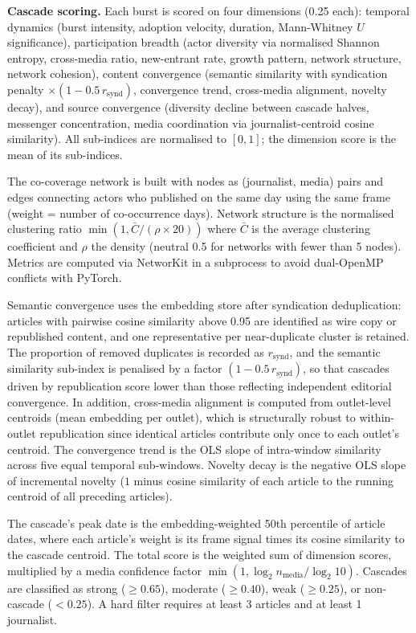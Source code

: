 \textbf{Cascade scoring.} Each burst is scored on four dimensions (0.25 each): temporal dynamics (burst intensity, adoption velocity, duration, Mann-Whitney $U$ significance), participation breadth (actor diversity via normalised Shannon entropy, cross-media ratio, new-entrant rate, growth pattern, network structure, network cohesion), content convergence (semantic similarity with syndication penalty $\times (1 - 0.5\, r_{\text{synd}})$, convergence trend, cross-media alignment, novelty decay), and source convergence (diversity decline between cascade halves, messenger concentration, media coordination via journalist-centroid cosine similarity). All sub-indices are normalised to $[0,1]$; the dimension score is the mean of its sub-indices.

The co-coverage network is built with nodes as (journalist, media) pairs and edges connecting actors who published on the same day using the same frame (weight = number of co-occurrence days). Network structure is the normalised clustering ratio $\min(1, \bar{C}/(\rho \times 20))$ where $\bar{C}$ is the average clustering coefficient and $\rho$ the density (neutral 0.5 for networks with fewer than 5 nodes). Metrics are computed via NetworKit in a subprocess to avoid dual-OpenMP conflicts with PyTorch.

Semantic convergence uses the embedding store after syndication deduplication: articles with pairwise cosine similarity above 0.95 are identified as wire copy or republished content, and one representative per near-duplicate cluster is retained. The proportion of removed duplicates is recorded as $r_{\text{synd}}$, and the semantic similarity sub-index is penalised by a factor $(1 - 0.5\, r_{\text{synd}})$, so that cascades driven by republication score lower than those reflecting independent editorial convergence. In addition, cross-media alignment is computed from outlet-level centroids (mean embedding per outlet), which is structurally robust to within-outlet republication since identical articles contribute only once to each outlet's centroid. The convergence trend is the OLS slope of intra-window similarity across five equal temporal sub-windows. Novelty decay is the negative OLS slope of incremental novelty ($1$ minus cosine similarity of each article to the running centroid of all preceding articles).

The cascade's peak date is the embedding-weighted 50th percentile of article dates, where each article's weight is its frame signal times its cosine similarity to the cascade centroid. The total score is the weighted sum of dimension scores, multiplied by a media confidence factor $\min(1, \log_2 n_{\text{media}} / \log_2 10)$. Cascades are classified as strong ($\geq 0.65$), moderate ($\geq 0.40$), weak ($\geq 0.25$), or non-cascade ($< 0.25$). A hard filter requires at least 3 articles and at least 1 journalist.

